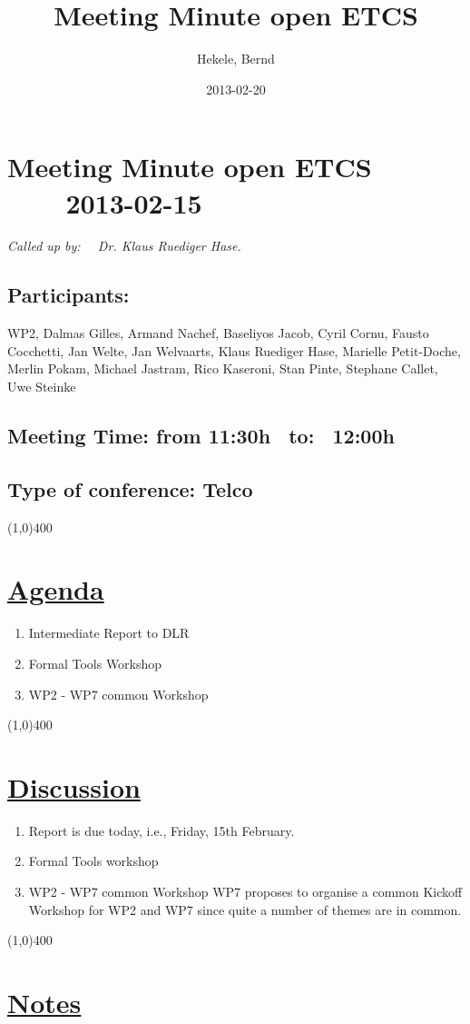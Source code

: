 \documentclass[a4paper]{article}
\title{Meeting Minute open ETCS}
\author{Hekele, Bernd}
\date{2013-02-20}
\begin{document}
\section*{\large{Meeting Minute open ETCS \ \ \ \ 2013-02-15}}

\large{\emph{Called up by: \ \  Dr. Klaus Ruediger Hase.}}

\subsection*{Participants:} WP2, Dalmas Gilles, Armand Nachef, Baseliyos Jacob, Cyril Cornu,  Fausto Cocchetti, Jan Welte, Jan Welvaarts, Klaus Ruediger Hase, Marielle Petit-Doche, Merlin Pokam, Michael Jastram, Rico Kaseroni, Stan Pinte, Stephane Callet, Uwe Steinke\\

\subsection*{Meeting Time: from 11:30h \ to: \ 12:00h}

\subsection*{Type of conference: Telco}

\line(1,0){400}
\section*{\underline{Agenda}}
\begin{enumerate}
\item Intermediate Report to DLR
\item Formal Tools Workshop
\item WP2 - WP7 common Workshop
\end{enumerate}
\line(1,0){400}
\section*{\underline{Discussion}}

\begin{enumerate}

\item Report is due today, i.e., Friday, 15th February.\newline

\item Formal Tools workshop\newline

\item WP2 - WP7 common Workshop\newline
WP7 proposes to organise a common Kickoff Workshop for WP2 and WP7 since quite a number of themes are in common.
 
\end{enumerate}

\line(1,0){400}
\section*{\underline{Notes}}
\end{document}
